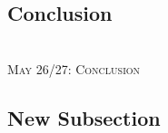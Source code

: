 \documentclass[11pt]{article}
\begin{document}
\vspace{2mm}
\subsection*{Conclusion}

~\\
\noindent \textsc{May 26/27: Conclusion} \\

\subsection*{New Subsection}
\end{document}
